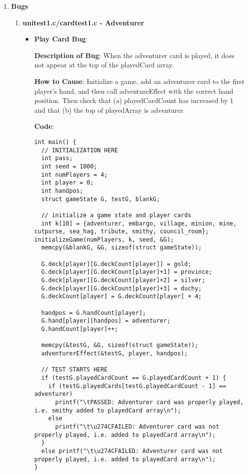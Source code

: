 \documentclass[11pt,letterpaper]{article}
\begin{document}
\begin{enumerate}[label=\Roman*.]
  \item \textbf{Bugs}

    \begin{enumerate}
      \item \textbf{unitest1.c/cardtest1.c - Adventurer}
        
        \begin{itemize}[leftmargin=*]

        \item \textbf{Play Card Bug}:

        \textbf{Description of Bug}: When the adventurer card is played, it does
          not appear at the top of the playedCard array.

        \textbf{How to Cause}: Initialize a game, add an adventurer card to 
          the first player's hand, and then call adventureEffect with the correct
          hand position. Then check that (a) playedCardCount has increased by
          1 and that (b) the top of playedArray is adventurer.

        \textbf{Code}:
          \begin{lstlisting}
int main() {
  // INITIALIZATION HERE
  int pass;                             
  int seed = 1000;                      
  int numPlayers = 4;                   
  int player = 0;                       
  int handpos;                          
  struct gameState G, testG, blankG;    

  // initialize a game state and player cards
  int k[10] = {adventurer, embargo, village, minion, mine, cutpurse, sea_hag, tribute, smithy, council_room}; initializeGame(numPlayers, k, seed, &G);
  memcpy(&blankG, &G, sizeof(struct gameState));

  G.deck[player][G.deckCount[player]] = gold;         
  G.deck[player][G.deckCount[player]+1] = province;
  G.deck[player][G.deckCount[player]+2] = silver;
  G.deck[player][G.deckCount[player]+3] = duchy;
  G.deckCount[player] = G.deckCount[player] + 4;

  handpos = G.handCount[player];                     
  G.hand[player][handpos] = adventurer;     
  G.handCount[player]++;                                
  
  memcpy(&testG, &G, sizeof(struct gameState));         
  adventurerEffect(&testG, player, handpos);                     
  
  // TEST STARTS HERE
  if (testG.playedCardCount == G.playedCardCount + 1) {
    if (testG.playedCards[testG.playedCardCount - 1] == adventurer)
      printf("\tPASSED: Adventurer card was properly played, i.e. smithy added to playedCard array\n");
    else
      printf("\t\u274CFAILED: Adventurer card was not properly played, i.e. added to playedCard array\n");
  } 
  else printf("\t\u274CFAILED: Adventurer card was not properly played, i.e. added to playedCard array\n");
}
          \end{lstlisting}


\end{itemize}
\end{enumerate}
\end{enumerate}
\end{document}
